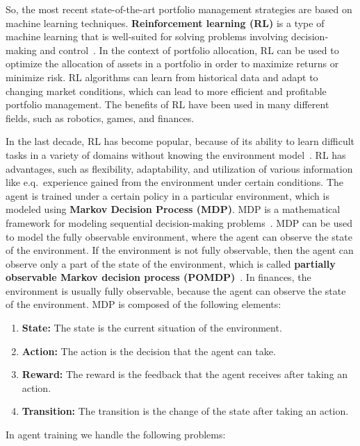 \documentclass[../xlapes02]{subfiles}
\begin{document}
So, the most recent state-of-the-art portfolio management strategies are based on machine learning techniques.
\textbf{Reinforcement learning (RL)} is a type of machine learning that is well-suited for solving problems involving decision-making and control~\cite{sutton2018reinforcement}.
In the context of portfolio allocation, RL can be used to optimize the allocation of assets in a portfolio in order to maximize returns or minimize risk.
RL algorithms can learn from historical data and adapt to changing market conditions, which can lead to more efficient and profitable portfolio management.
The benefits of RL have been used in many different fields, such as robotics, games, and finances.

In the last decade, RL has become popular, because of its ability to learn difficult tasks in a variety of domains without knowing the environment model~\cite{sutton2018reinforcement}.
RL has advantages, such as flexibility, adaptability, and utilization of various information like e.q.\ experience gained from the environment under certain conditions.
The agent is trained under a certain policy in a particular environment, which is modeled using \textbf{Markov Decision Process (MDP)}.
MDP is a mathematical framework for modeling sequential decision-making problems~\cite{rao2022foundations}.
MDP can be used to model the fully observable environment, where the agent can observe the state of the environment.
If the environment is not fully observable, then the agent can observe only a part of the state of the environment, which is called \textbf{partially observable Markov decision process (POMDP)}~\cite{sutton2018reinforcement}.
In finances, the environment is usually fully observable, because the agent can observe the state of the environment.
MDP is composed of the following elements:
\begin{enumerate}[label=\textbf{\arabic*}., ref=\arabic*]
    \item \textbf{State:} The state is the current situation of the environment.
    \item \textbf{Action:} The action is the decision that the agent can take.
    \item \textbf{Reward:} The reward is the feedback that the agent receives after taking an action.
    \item \textbf{Transition:} The transition is the change of the state after taking an action.
\end{enumerate}
In agent training we handle the following problems:
\end{document}
